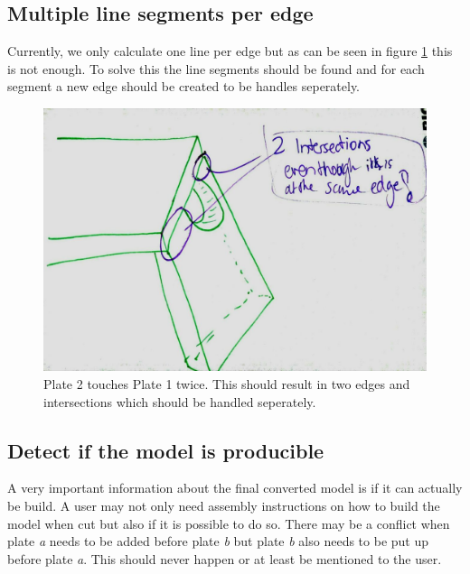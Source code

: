 \documentclass[../ClassicThesis.tex]{subfiles}
\begin{document}
\subsection{Multiple line segments per edge}
Currently, we only calculate one line per edge but as can be seen in figure \ref{fig:twoLineSegments} this is not enough. To solve this the line segments should be found and for each segment a new edge should be created to be handles seperately. 
\begin{figure}[!ht]
\centering
\includegraphics[width=0.5\columnwidth]{Images/06-2-joints-moreThanOneLinePerEdge.jpg}
\caption{Plate 2 touches Plate 1 twice. This should result in two edges and intersections which should be handled seperately.}
\label{fig:twoLineSegments}
\end{figure}

\subsection{Detect if the model is producible}
A very important information about the final converted model is if it can actually be build. A user may not only need assembly instructions on how to build the model when cut but also if it is possible to do so. There may be a conflict when plate \emph{a} needs to be added before plate \emph{b} but plate \emph{b} also needs to be put up before plate \emph{a}. This should never happen or at least be mentioned to the user.
\end{document}
